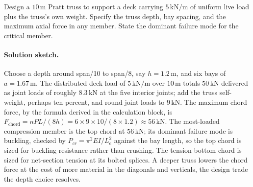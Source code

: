 \begin{exercise}
Design a $10\,\si{\meter}$ Pratt truss to support a deck carrying
$5\,\text{kN}/\text{m}$ of uniform live load plus the truss's own
weight. Specify the truss depth, bay spacing, and the maximum
axial force in any member. State the dominant failure mode for the
critical member.

\paragraph{Solution sketch.} Choose a depth around span/10 to span/8,
say $h = 1.2\,\si{\meter}$, and six bays of $a = 1.67\,\si{\meter}$. The
distributed deck load of $5\,\text{kN}/\text{m}$ over $10\,\si{\meter}$
totals $50\,\text{kN}$ delivered as joint loads of roughly
$8.3\,\text{kN}$ at the five interior joints; add the truss self-weight,
perhaps ten percent, and round joint loads to $9\,\text{kN}$. The
maximum chord force, by the formula derived in the calculation block,
is $F_{\text{chord}} = nPL/(8h) = 6 \times 9 \times 10/(8 \times 1.2)
\approx 56\,\text{kN}$. The most-loaded compression member is the top
chord at $56\,\text{kN}$; its dominant failure mode is buckling, checked
by $P_{cr} = \pi^2 EI/L_e^2$ against the bay length, so the top chord is
sized for buckling resistance rather than crushing. The tension bottom
chord is sized for net-section tension at its bolted splices. A deeper
truss lowers the chord force at the cost of more material in the
diagonals and verticals, the design trade the depth choice resolves.
\end{exercise}

